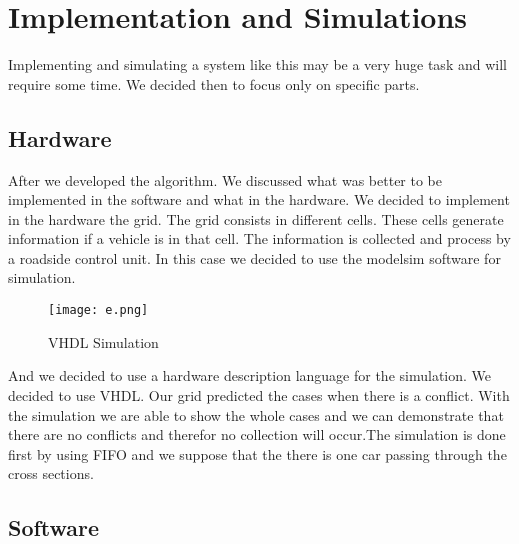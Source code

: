 \documentclass[conference]{IEEEtran}
\begin{document}
\section{Implementation and Simulations }
Implementing and simulating a system like this may be a very huge task and will require some time. We decided then to focus only on specific parts.  


\subsection{Hardware}

After we developed the algorithm. We discussed what was better to be implemented in the software and what in the hardware. We decided to implement in the hardware the grid. The grid consists in different cells. These cells generate information if a vehicle is in that cell. The information is collected and process by a roadside control unit. In this case we decided to use the modelsim software for simulation.
\begin{figure}[htp]
    \centering
     \texttt{[image: e.png]}
    \caption{VHDL Simulation
}
    \label{fig:reg-gen}
\end{figure}

And we decided to use a hardware description language for the simulation. We decided to use VHDL. Our grid predicted the cases when there is a conflict. With the simulation we are able to show the whole cases and we can demonstrate that there are no conflicts and therefor no collection will occur.The simulation is done first by using FIFO and we suppose that the there is one car passing through the cross sections.


\subsection{Software}
\end{document}
